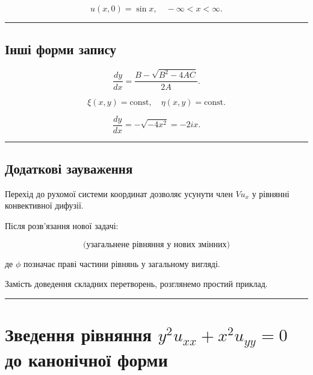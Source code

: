 \documentclass[
  ukrainian,
]{article}
\begin{document}
\[
u(x, 0) = \sin x, \quad -\infty < x < \infty.
\]

\begin{center}\rule{0.5\linewidth}{0.5pt}\end{center}

\subsection{Інші форми
запису}\label{ux456ux43dux448ux456-ux444ux43eux440ux43cux438-ux437ux430ux43fux438ux441ux443}

\[
\frac{dy}{dx} = \frac{B - \sqrt{B^2 - 4AC}}{2A}.
\]

\[
\xi(x, y) = \text{const}, \quad \eta(x, y) = \text{const}.
\]

\[
\frac{dy}{dx} = -\sqrt{-4x^2} = -2ix.
\]

\begin{center}\rule{0.5\linewidth}{0.5pt}\end{center}

\subsection{Додаткові
зауваження}\label{ux434ux43eux434ux430ux442ux43aux43eux432ux456-ux437ux430ux443ux432ux430ux436ux435ux43dux43dux44f}

Перехід до рухомої системи координат дозволяє усунути член \(V u_x\) у
рівнянні конвективної дифузії.

Після розв'язання нової задачі:

\[
\text{(узагальнене рівняння у нових змінних)}
\]

де \(\phi\) позначає праві частини рівнянь у загальному вигляді.

Замість доведення складних перетворень, розглянемо простий приклад.

\begin{center}\rule{0.5\linewidth}{0.5pt}\end{center}

\section{\texorpdfstring{Зведення рівняння
\(y^2 u_{xx} + x^2 u_{yy} = 0\) до канонічної
форми}{Зведення рівняння y\^{}2 u\_\{xx\} + x\^{}2 u\_\{yy\} = 0 до канонічної форми}}\label{ux437ux432ux435ux434ux435ux43dux43dux44f-ux440ux456ux432ux43dux44fux43dux43dux44f-y2-u_xx-x2-u_yy-0-ux434ux43e-ux43aux430ux43dux43eux43dux456ux447ux43dux43eux457-ux444ux43eux440ux43cux438}
\end{document}
